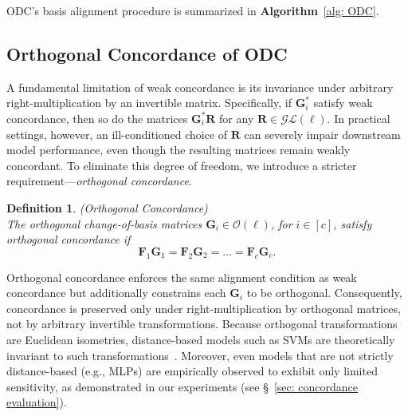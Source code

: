 \documentclass[final,3p,times]{elsarticle}
\theoremstyle{plain}
\newtheorem{definition}[theorem]{Definition}
\newcommand{\matr}[1]{\bm{#1}}        %
\begin{document}
ODC's basis alignment procedure is summarized in \textbf{Algorithm}~\ref{alg: ODC}. 

\subsection{Orthogonal Concordance of ODC}
\label{subsec: ODC concordance}

A fundamental limitation of weak concordance is its invariance under arbitrary right-multiplication by an invertible matrix. Specifically, if  $\matr{G}_i^*$ satisfy weak concordance, then so do the matrices $\matr{G}_i^* \matr{R}$ for any $\matr{R} \in \mathcal{GL}(\ell)$. In practical settings, however, an ill-conditioned choice of $\matr{R}$ can severely impair downstream model performance, even though the resulting matrices remain weakly concordant. To eliminate this degree of freedom, we introduce a stricter requirement---\emph{orthogonal concordance}.

\begin{definition} \label{def:orth_concordance} (Orthogonal Concordance)\\ 
The orthogonal change-of-basis matrices \(\matr{G}_i \in \mathcal{O}(\ell)\), for \( i \in [c] \), satisfy orthogonal concordance if 
\begin{equation} 
\matr{F}_1 \matr{G}_1 = \matr{F}_2 \matr{G}_2 = \dots = \matr{F}_c \matr{G}_c. 
\end{equation} 
\end{definition}

Orthogonal concordance enforces the same alignment condition as weak concordance but additionally constrains each $\matr{G}_i$ to be orthogonal. Consequently, concordance is preserved only under right-multiplication by orthogonal matrices, not by arbitrary invertible transformations. Because orthogonal transformations are Euclidean isometries, distance-based models such as SVMs are theoretically invariant to such transformations~\cite{GeometricPerturbation}. Moreover, even models that are not strictly distance-based (e.g., MLPs) are empirically observed to exhibit only limited sensitivity, as demonstrated in our experiments (see \S~\ref{sec: concordance evaluation}).
\end{document}
